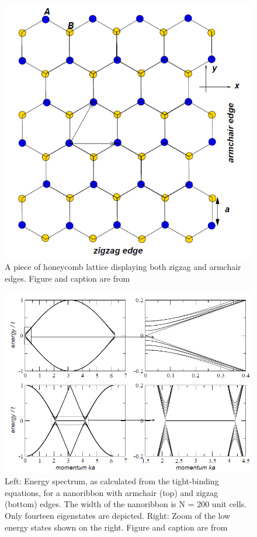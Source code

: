 \documentclass[]{article}
\begin{document}
\begin{figure}[htb]
	\centering
	\includegraphics[scale = 0.6]{zigzag_armchair_GNR.PNG}
	\caption{A piece of honeycomb lattice displaying both zigzag and armchair edges. Figure and caption are from \cite{The_Electronic_Properties_of_Graphene}}
	\label{fig: zizgaz_armchair_GNR}
\end{figure}


\begin{figure}[htb]
	\centering
	\includegraphics[scale = 0.6]{armchair_zigzag_dispersion.PNG}
	\caption{Left: Energy spectrum, as calculated from the tight-binding equations, for a nanoribbon with armchair (top) and zigzag (bottom) edges. The width of the nanoribbon is N = 200 unit cells. Only fourteen eigenstates are depicted. Right: Zoom of the low energy states shown on the right. Figure and caption are from \cite{The_Electronic_Properties_of_Graphene}}
	\label{fig: armchair_zigzag_energy_bands}
\end{figure}
\end{document}
